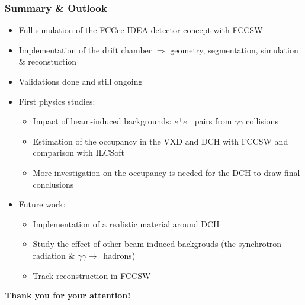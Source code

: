 \documentclass[aspectratio=169, hyperref={colorlinks=true,pdfpagelabels=false,linkcolor=black}, xcolor=dvipsnames,10pt]{beamer}
\begin{document}
\begin{frame}
\begin{columns}
	\end{columns}
	
\end{frame}

\label{lastslide}
\begin{frame}
  \frametitle{Summary \& Outlook}
  
  	\vspace{1cm}
	\begin{itemize}
	\item Full simulation of the FCCee-IDEA detector concept with FCCSW
	\item Implementation of the drift chamber 
		$\Rightarrow$ geometry, segmentation, simulation \& reconstuction
	\item Validations done and still ongoing 
	\item First physics studies:
		\begin{itemize}
		\item Impact of beam-induced backgrounds: $e^{+}e^{-}$ pairs from $\gamma\gamma$ collisions
	  	\item Estimation of the occupancy in the VXD and DCH with FCCSW and comparison with ILCSoft
	  	\item More investigation on the occupancy is needed for the DCH to draw final conclusions
	  	\end{itemize} \vspace{0.2cm}
	\item Future work:
		\begin{itemize}
		\item Implementation of a realistic material around DCH 
		\item Study the effect of other beam-induced
                  backgrouds (the synchrotron radiation \& $\gamma\gamma\rightarrow$~hadrons)
		\item Track reconstruction in FCCSW
		\end{itemize}
  	\end{itemize}

	\vspace{0.5cm}
	\centering
	\Large{\textbf{Thank you for your attention!}}
\end{frame}
\end{document}
